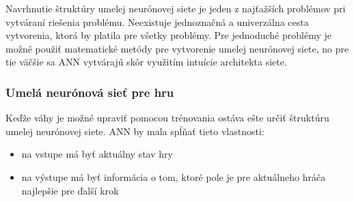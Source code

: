 Navrhnutie štruktúry umelej neurónovej siete je jeden z najťažších problémov pri vytváraní riešenia problému.
Neexistuje jednoznačná a univerzálna cesta vytvorenia, ktorá by platila pre všetky problémy.
Pre jednoduché problémy je možné použiť matematické metódy pre vytvorenie umelej neurónovej siete, no pre tie väčšie
sa ANN vytvárajú skôr využitím intuície architekta siete.

\subsubsection{Umelá neurónová sieť pre hru}

Keďže váhy je možné upraviť pomocou trénovania ostáva ešte určiť štruktúru umelej neurónovej siete.
ANN by mala spĺňať tieto vlastnosti:
\begin{itemize}
    \item na vstupe má byť aktuálny stav hry
    \item na výstupe má byť informácia o tom, ktoré pole je pre aktuálneho hráča najlepšie pre ďalší krok
\end{itemize}

